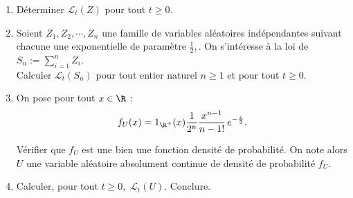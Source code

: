 {\begin{enumerate}
\item D\'eterminer $\mathcal{L}_{t}(Z)$ pour tout $t\geq 0$. 
\item Soient $Z_1,Z_2,\cdots{},Z_n$ une famille de variables aléatoires indépendantes suivant chacune une exponentielle de param\`etre $\frac{1}{2},$. On s'int\'eresse \`a la loi de $S_n:=\displaystyle\sum_{i=1}^{n}Z_i$.\\

Calculer $\mathcal{L}_t(S_n)$ pour tout entier naturel $n\geq 1$ et pour tout $t\geq 0$.


\item On pose pour tout $x \in \R$ :
$$f_U(x)=\mathrm{1}_{\R^{+}}(x)\frac{1}{2^n}\frac{x^{n-1}}{n-1!}\,e^{-\frac{x}{2}}.$$

V\'erifier que $f_U$ est une bien une fonction densité de probabilité. On note alors $U$ une variable aléatoire absolument continue de densit\'e de probabilit\'e $f_U$.


\item Calculer, pour tout $t\geq 0,$ $\mathcal{L}_t(U)$. Conclure.

\end{enumerate} 

}